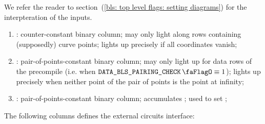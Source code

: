 We refer the reader to section~(\ref{bls: top level flags: setting diagrams}) for the interpteration of the inputs.
\begin{enumerate}[resume]
    \item
        \isInfinity:
        counter-constant binary column;
        may only light along rows containing (supposedly) curve points;
        lights up precisely if all coordinates vanish;
    \item
        \both{\nontrivialPairOfPointsBit}:
        pair-of-points-constant binary column;
        may only light up for data rows of the \inst{\prcNameBlsPairingCheck} precompile (i.e. when $\isBlsPairingCheckData \equiv 1$);
        lights up precisely when neither point of the pair of points is the point at infinity;
    \item
        \both{\nontrivialPairOfPointsAcc}:
        pair-of-points-constant binary column;
        accumulates \nontrivialPairOfPointsBit{};
        used to set \wellformedDataNontrivial{};
\end{enumerate}
The following columns defines the external circuits interface:
